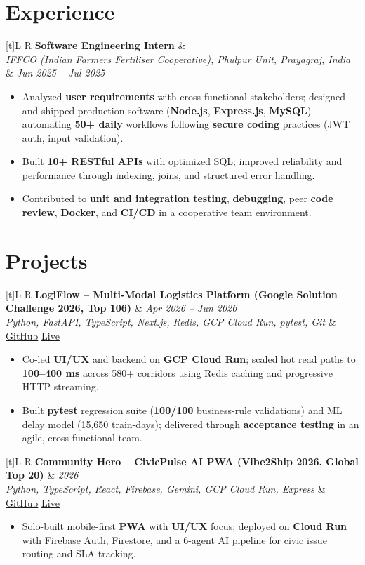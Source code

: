 \documentclass[a4paper,10pt]{article}
\newcommand{\resumeSubheading}[4]{
  \vspace{0.5mm}
  \noindent
  \begin{tabularx}{\textwidth}[t]{L R}
    \textbf{#1} & #4 \\
    \textit{#3} & \textit{#2} \\
  \end{tabularx}
  \vspace{-0.5mm}
}
\newcommand{\resumeProject}[4]{
  \vspace{0.5mm}
  \noindent
  \begin{tabularx}{\textwidth}[t]{L R}
    \textbf{#1} & \textit{#3} \\
    \textit{#2} & #4 \\
  \end{tabularx}
  \vspace{-0.5mm}
}
\begin{document}
\section{Experience}
\small
\resumeSubheading
  {Software Engineering Intern}{Jun 2025 -- Jul 2025}
  {IFFCO (Indian Farmers Fertiliser Cooperative), Phulpur Unit, Prayagraj, India}{}
\begin{itemize}
  \item Analyzed \textbf{user requirements} with cross-functional stakeholders; designed and shipped production software (\textbf{Node.js}, \textbf{Express.js}, \textbf{MySQL}) automating \textbf{50+ daily} workflows following \textbf{secure coding} practices (JWT auth, input validation).
  \item Built \textbf{10+ RESTful APIs} with optimized SQL; improved reliability and performance through indexing, joins, and structured error handling.
  \item Contributed to \textbf{unit and integration testing}, \textbf{debugging}, peer \textbf{code review}, \textbf{Docker}, and \textbf{CI/CD} in a cooperative team environment.
\end{itemize}

\section{Projects}
\small

\resumeProject
  {LogiFlow -- Multi-Modal Logistics Platform (Google Solution Challenge 2026, Top 106)}
  {Python, FastAPI, TypeScript, Next.js, Redis, GCP Cloud Run, pytest, Git}
  {Apr 2026 -- Jun 2026}
  {\href{https://github.com/Ojas-Srivastava05/LogiFlow-Solution-Challenge-2026}{GitHub} \textbar{} \href{https://logi-flow-solution-challenge-2026.vercel.app/}{Live}}
\begin{itemize}
  \item Co-led \textbf{UI/UX} and backend on \textbf{GCP Cloud Run}; scaled hot read paths to \textbf{100--400 ms} across 580+ corridors using Redis caching and progressive HTTP streaming.
  \item Built \textbf{pytest} regression suite (\textbf{100/100} business-rule validations) and ML delay model (15,650 train-days); delivered through \textbf{acceptance testing} in an agile, cross-functional team.
\end{itemize}

\resumeProject
  {Community Hero -- CivicPulse AI PWA (Vibe2Ship 2026, Global Top 20)}
  {Python, TypeScript, React, Firebase, Gemini, GCP Cloud Run, Express}
  {2026}
  {\href{https://github.com/Ojas-Srivastava05/community-hero}{GitHub} \textbar{} \href{https://community-hero-987477089222.asia-south1.run.app}{Live}}
\begin{itemize}
  \item Solo-built mobile-first \textbf{PWA} with \textbf{UI/UX} focus; deployed on \textbf{Cloud Run} with Firebase Auth, Firestore, and a 6-agent AI pipeline for civic issue routing and SLA tracking.
\end{itemize}
\end{document}
